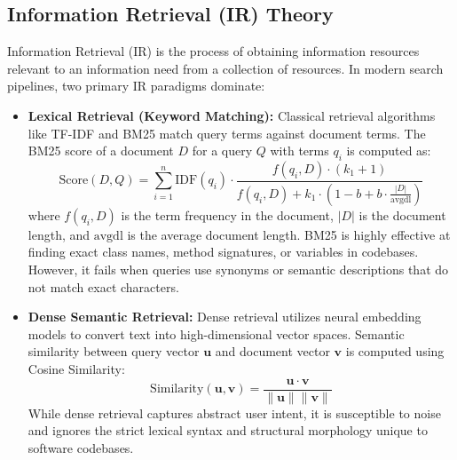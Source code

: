 \documentclass[12pt,letterpaper,oneside]{report}
\begin{document}
\subsection{Information Retrieval (IR) Theory}
Information Retrieval (IR) is the process of obtaining information resources relevant to an information need from a collection of resources. In modern search pipelines, two primary IR paradigms dominate:
\begin{itemize}
    \item \textbf{Lexical Retrieval (Keyword Matching):} Classical retrieval algorithms like TF-IDF and BM25 \cite{bm25} match query terms against document terms. The BM25 score of a document $D$ for a query $Q$ with terms $q_i$ is computed as:
    \begin{equation}
        \text{Score}(D, Q) = \sum_{i=1}^{n} \text{IDF}(q_i) \cdot \frac{f(q_i, D) \cdot (k_1 + 1)}{f(q_i, D) + k_1 \cdot \left(1 - b + b \cdot \frac{|D|}{\text{avgdl}}\right)}
    \end{equation}
    where $f(q_i, D)$ is the term frequency in the document, $|D|$ is the document length, and $\text{avgdl}$ is the average document length. BM25 is highly effective at finding exact class names, method signatures, or variables in codebases. However, it fails when queries use synonyms or semantic descriptions that do not match exact characters.
    
    \item \textbf{Dense Semantic Retrieval:} Dense retrieval utilizes neural embedding models to convert text into high-dimensional vector spaces. Semantic similarity between query vector $\mathbf{u}$ and document vector $\mathbf{v}$ is computed using Cosine Similarity:
    \begin{equation}
        \text{Similarity}(\mathbf{u}, \mathbf{v}) = \frac{\mathbf{u} \cdot \mathbf{v}}{\|\mathbf{u}\| \|\mathbf{v}\|}
    \end{equation}
    While dense retrieval captures abstract user intent, it is susceptible to noise and ignores the strict lexical syntax and structural morphology unique to software codebases.
\end{itemize}
\end{document}
